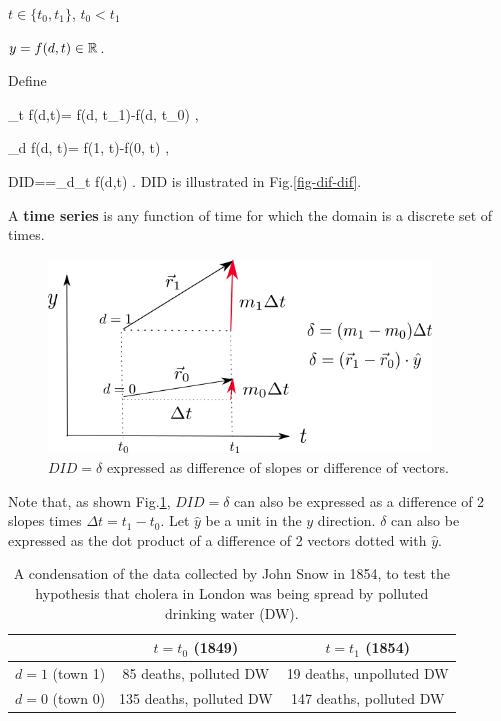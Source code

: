 $t\in \{t_0, t_1\}$, $t_0< t_1$

$y=f(d,t)\in { \mathbb{R}}$.

Define

\beq
\Delta_t f(d,t)= f(d, t_1)-f(d, t_0)
\;,
\eeq

\beq
\Delta_d f(d, t)= f(1, t)-f(0, t)
\;,
\eeq

\beq
DID=\delta=\Delta_d\Delta_t f(d,t)
\;.
\eeq
DID is illustrated in
 Fig.\ref{fig-dif-dif}. 


A {\bf time series} 
is  any function of time
for which the domain is a discrete set of times.




\begin{figure}[h!]
\centering
\includegraphics[width=4in]{did/did-3-prod}
\caption{$DID=\delta$ expressed as 
difference of slopes or 
difference of vectors.} 
\label{fig-did-3-prod}
\end{figure}

Note that,
as shown Fig.\ref{fig-did-3-prod},
$DID=\delta$ can also be expressed
as a difference of 2 slopes
times $\Delta t = t_1-t_0$.
Let
$\hat{y}$ be a unit 
in the $y$ direction.
$\delta$ can also be expressed
as the dot product of a difference of 2 vectors
dotted with $\hat{y}$.


\begin{table}[h!]
\centering
{\renewcommand{\arraystretch}{1.4}
\begin{tabular}{|c|c|c|}
\hline 
\rowcolor[HTML]{ECF4FF} 
 & $t=t_0 $ (1849) & $t=t_1$ (1854) \\ 
\hline
$d=1 $ (town 1)\cellcolor[HTML]{ECF4FF}
&85 deaths, polluted DW&19 deaths, unpolluted DW\\
\hline 
$d=0 $ (town 0)\cellcolor[HTML]{ECF4FF} 
&135 deaths, polluted DW& 147 deaths, polluted DW\\ 
\end{tabular}
}
\caption{A condensation of the data
collected by 
John Snow in 1854,
to test the hypothesis
that cholera in London was being spread by
polluted drinking water (DW).}
\label{tab-john-snow}
\end{table}


